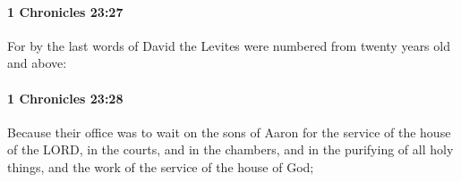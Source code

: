 		\paragraph{1 Chronicles 23:27} %
			\label{1CHRONICLES-23-27}

			For by the last words of David the Levites were numbered from twenty years old and above:


		\paragraph{1 Chronicles 23:28} %
			\label{1CHRONICLES-23-28}

			Because their office was to wait on the sons of Aaron for the service of the house of the LORD, in the courts, and in the chambers, and in the purifying of all holy things, and the work of the service of the house of God;



